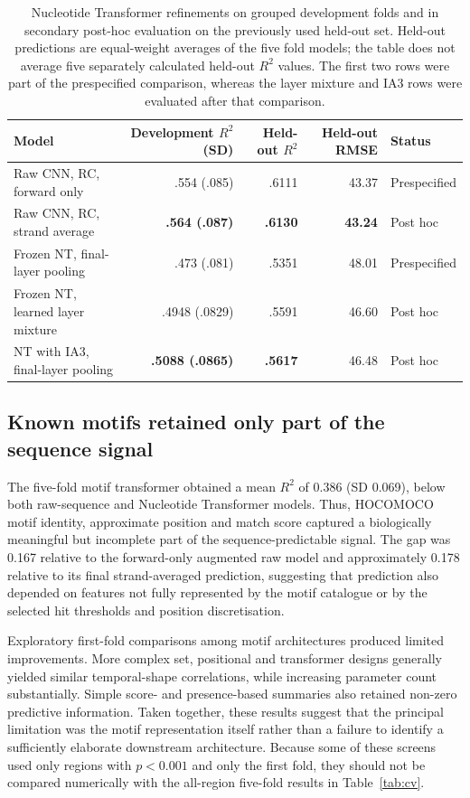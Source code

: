\documentclass[a4paper,12pt]{article}
\begin{document}
\begin{table}[htbp]
\centering
\caption{Nucleotide Transformer refinements on grouped development folds and in secondary post-hoc evaluation on the previously used held-out set. Held-out predictions are equal-weight averages of the five fold models; the table does not average five separately calculated held-out $R^2$ values. The first two rows were part of the prespecified comparison, whereas the layer mixture and IA3 rows were evaluated after that comparison.}
\label{tab:ntposthoc}
\small
\begin{tabular}{lrrrl}
\toprule
Model & Development $R^2$ (SD) & Held-out $R^2$ & Held-out RMSE & Status \\
\midrule
Raw CNN, RC, forward only & .554 (.085) & .6111 & 43.37 & Prespecified \\
Raw CNN, RC, strand average & \textbf{.564 (.087)} & \textbf{.6130} & \textbf{43.24} & Post hoc \\
Frozen NT, final-layer pooling & .473 (.081) & .5351 & 48.01 & Prespecified \\
Frozen NT, learned layer mixture & .4948 (.0829) & .5591 & 46.60 & Post hoc \\
NT with IA3, final-layer pooling & \textbf{.5088 (.0865)} & \textbf{.5617} & 46.48 & Post hoc \\
\bottomrule
\end{tabular}
\end{table}

\subsection{Known motifs retained only part of the sequence signal}

The five-fold motif transformer obtained a mean $R^2$ of 0.386 (SD 0.069), below both raw-sequence and Nucleotide Transformer models. Thus, HOCOMOCO motif identity, approximate position and match score captured a biologically meaningful but incomplete part of the sequence-predictable signal. The gap was 0.167 relative to the forward-only augmented raw model and approximately 0.178 relative to its final strand-averaged prediction, suggesting that prediction also depended on features not fully represented by the motif catalogue or by the selected hit thresholds and position discretisation.

Exploratory first-fold comparisons among motif architectures produced limited improvements. More complex set, positional and transformer designs generally yielded similar temporal-shape correlations, while increasing parameter count substantially. Simple score- and presence-based summaries also retained non-zero predictive information. Taken together, these results suggest that the principal limitation was the motif representation itself rather than a failure to identify a sufficiently elaborate downstream architecture. Because some of these screens used only regions with $p<0.001$ and only the first fold, they should not be compared numerically with the all-region five-fold results in Table~\ref{tab:cv}.
\end{document}
